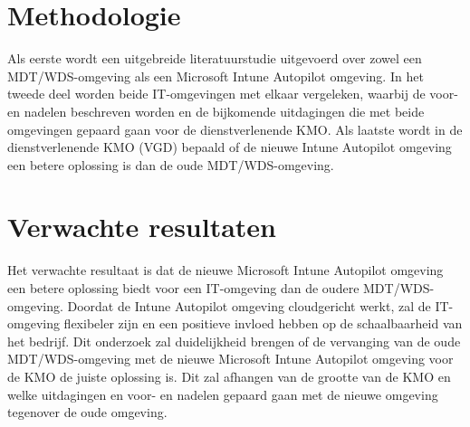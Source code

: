 
\section{Methodologie}
\label{sec:methodologie}

Als eerste wordt een uitgebreide literatuurstudie uitgevoerd over zowel een MDT/WDS-omgeving als een Microsoft Intune Autopilot omgeving. 
\newline
In het tweede deel worden beide IT-omgevingen met elkaar vergeleken, waarbij de voor- en nadelen beschreven worden en de bijkomende uitdagingen die met beide omgevingen gepaard gaan voor de dienstverlenende KMO.
\newline
Als laatste wordt in de dienstverlenende KMO (VGD) bepaald of de nieuwe Intune Autopilot omgeving een betere oplossing is dan de oude MDT/WDS-omgeving.


\section{Verwachte resultaten}
\label{sec:verwachte_resultaten}

Het verwachte resultaat is dat de nieuwe Microsoft Intune Autopilot omgeving een betere oplossing biedt voor een IT-omgeving dan de oudere MDT/WDS-omgeving. Doordat de Intune Autopilot omgeving cloudgericht werkt, zal de IT-omgeving flexibeler zijn en een positieve invloed hebben op de schaalbaarheid van het bedrijf. Dit onderzoek zal duidelijkheid brengen of de vervanging van de oude MDT/WDS-omgeving met de nieuwe Microsoft Intune Autopilot omgeving voor de KMO de juiste oplossing is. Dit zal afhangen van de grootte van de KMO en welke uitdagingen en voor- en nadelen gepaard gaan met de nieuwe omgeving tegenover de oude omgeving.


